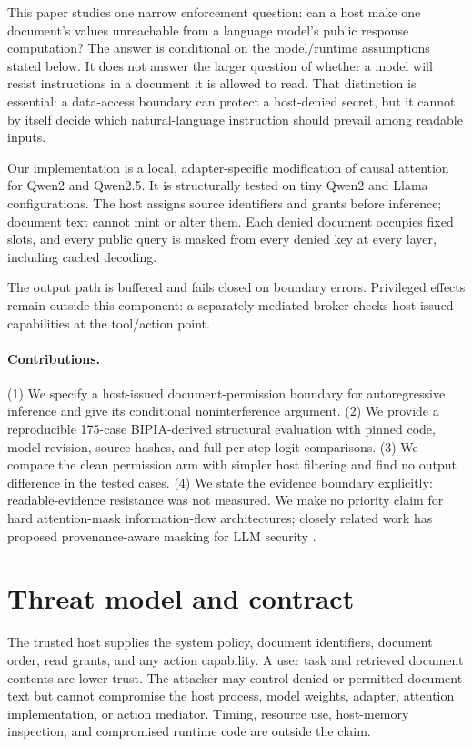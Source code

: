 \documentclass[11pt]{article}
\begin{document}
This paper studies one narrow enforcement question: can a host make one document's values unreachable from a language model's public response computation? The answer is conditional on the model/runtime assumptions stated below. It does not answer the larger question of whether a model will resist instructions in a document it is allowed to read. That distinction is essential: a data-access boundary can protect a host-denied secret, but it cannot by itself decide which natural-language instruction should prevail among readable inputs.

Our implementation is a local, adapter-specific modification of causal attention for Qwen2 and Qwen2.5. It is structurally tested on tiny Qwen2 and Llama configurations. The host assigns source identifiers and grants before inference; document text cannot mint or alter them. Each denied document occupies fixed slots, and every public query is masked from every denied key at every layer, including cached decoding.

The output path is buffered and fails closed on boundary errors. Privileged effects remain outside this component: a separately mediated broker checks host-issued capabilities at the tool/action point.

\paragraph{Contributions.} (1) We specify a host-issued document-permission boundary for autoregressive inference and give its conditional noninterference argument. (2) We provide a reproducible 175-case BIPIA-derived structural evaluation with pinned code, model revision, source hashes, and full per-step logit comparisons. (3) We compare the clean permission arm with simpler host filtering and find no output difference in the tested cases. (4) We state the evidence boundary explicitly: readable-evidence resistance was not measured.\newline
We make no priority claim for hard attention-mask information-flow architectures; closely related work has proposed provenance-aware masking for LLM security \citep{gupta2025civ}.

\section{Threat model and contract}

The trusted host supplies the system policy, document identifiers, document order, read grants, and any action capability. A user task and retrieved document contents are lower-trust. The attacker may control denied or permitted document text but cannot compromise the host process, model weights, adapter, attention implementation, or action mediator. Timing, resource use, host-memory inspection, and compromised runtime code are outside the claim.
\end{document}
